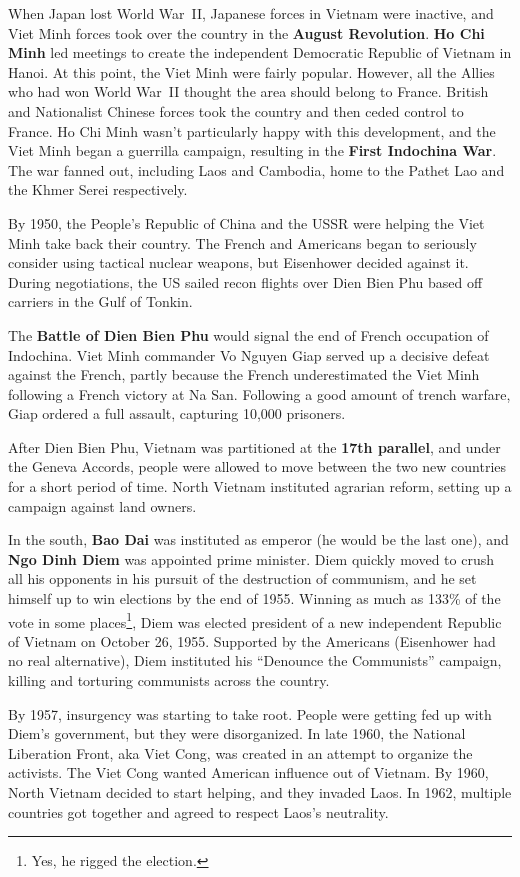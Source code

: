 When Japan lost World War~II, Japanese forces in Vietnam were inactive,
and Viet Minh forces took over the country in the \textbf{August Revolution}.
\textbf{Ho Chi Minh} led meetings to create the independent Democratic Republic of Vietnam in Hanoi.
At this point, the Viet Minh were fairly popular.
However, all the Allies who had won World War~II thought the area should belong to France.
British and Nationalist Chinese forces took the country and then ceded control to France.
Ho Chi Minh wasn't particularly happy with this development,
and the Viet Minh began a guerrilla campaign, resulting in the \textbf{First Indochina War}.
The war fanned out, including Laos and Cambodia,
home to the Pathet Lao and the Khmer Serei respectively.

By 1950,
the People's Republic of China and the USSR were helping the Viet Minh take back their country.
The French and Americans began to seriously consider using tactical nuclear weapons,
but Eisenhower decided against it.
During negotiations,
the US sailed recon flights over Dien Bien Phu based off carriers in the Gulf of Tonkin.

The \textbf{Battle of Dien Bien Phu} would signal the end of French occupation of Indochina.
Viet Minh commander Vo Nguyen Giap served up a decisive defeat against the French,
partly because the French underestimated the Viet Minh following a French victory at Na San.
Following a good amount of trench warfare, Giap ordered a full assault, capturing 10,000 prisoners.

After Dien Bien Phu, Vietnam was partitioned at the \textbf{17th parallel},
and under the Geneva Accords,
people were allowed to move between the two new countries for a short period of time.
North Vietnam instituted agrarian reform, setting up a campaign against land owners.

In the south, \textbf{Bao Dai} was instituted as emperor (he would be the last one),
and \textbf{Ngo Dinh Diem} was appointed prime minister.
Diem quickly moved to crush all his opponents in his pursuit of the destruction of communism,
and he set himself up to win elections by the end of 1955.
Winning as much as 133\% of the vote in some places\footnote{Yes, he rigged the election.},
Diem was elected president of a new independent Republic of Vietnam on October 26, 1955.
Supported by the Americans (Eisenhower had no real alternative),
Diem instituted his ``Denounce the Communists'' campaign,
killing and torturing communists across the country.

By 1957, insurgency was starting to take root.
People were getting fed up with Diem's government, but they were disorganized.
In late 1960, the National Liberation Front, aka Viet Cong,
was created in an attempt to organize the activists.
The Viet Cong wanted American influence out of Vietnam.
By 1960, North Vietnam decided to start helping, and they invaded Laos.
In 1962, multiple countries got together and agreed to respect Laos's neutrality.


